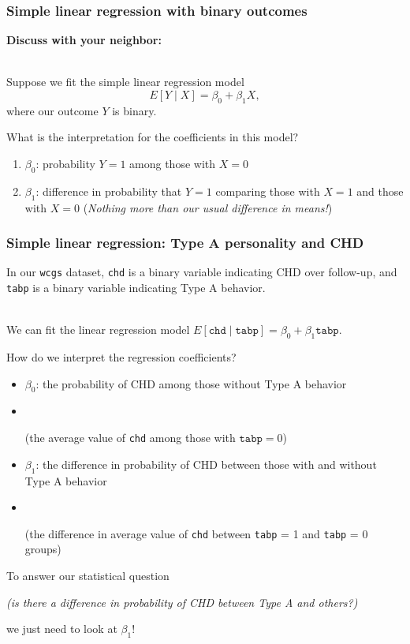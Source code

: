 \documentclass[10pt,t]{beamer}
\begin{document}
\begin{frame}
	\frametitle{Simple linear regression with binary outcomes}
	\textbf{Discuss with your neighbor:} 
	\\ ~\ 
	
	Suppose we fit the simple linear regression model $$E[Y \mid X] = \beta_0 + \beta_1 X,$$ where our outcome $Y$ is binary.
	
	What is the interpretation for the coefficients in this model?
	
	\begin{enumerate}
		\item $\beta_0$: probability $Y = 1$ among those with $X = 0$
		\item $\beta_1$: difference in probability that $Y = 1$ comparing those with $X = 1$ and those with $X = 0$ \footnotesize{(\textit{Nothing more than our usual difference in means!})}
	\end{enumerate} 
\end{frame}

\begin{frame}
	\frametitle{Simple linear regression: Type A personality and CHD}
	
	In our \texttt{wcgs} dataset, \texttt{chd} is a binary variable indicating CHD over follow-up, and \texttt{tabp} is a binary variable indicating Type A behavior. 
	\\ ~\
	
	We can fit the linear regression model $E[\texttt{chd} \mid \texttt{tabp}] = \beta_0 + \beta_1\texttt{tabp} $.
	
	How do we interpret the regression coefficients? \vspace{0.3cm}
	
	\begin{itemize}
		\item \color{blue} $\beta_0$: \pause the probability of CHD among those without Type A behavior \pause \color{black}\vspace{-0.2cm}
		\item[] \ \ \begin{scriptsize} (the average value of \texttt{chd} among those with $\texttt{tabp} = 0$) \end{scriptsize} \pause
		\item \color{blue} $\beta_1$: \pause the difference in probability of CHD between those with and without Type A behavior \pause \color{black} \vspace{-0.2cm}
		\item[] \ \ \begin{scriptsize}(the difference in average value of \texttt{chd} between \texttt{tabp} = 1 and \texttt{tabp} = 0 groups) \pause \end{scriptsize}
	\end{itemize} 
	
	\vspace{0.3cm}
	To answer our statistical question \begin{small}\textit{(is there a difference in probability of CHD between Type A and others?)}\end{small} we just need to look at $\beta_1$!
\end{frame}
\end{document}
